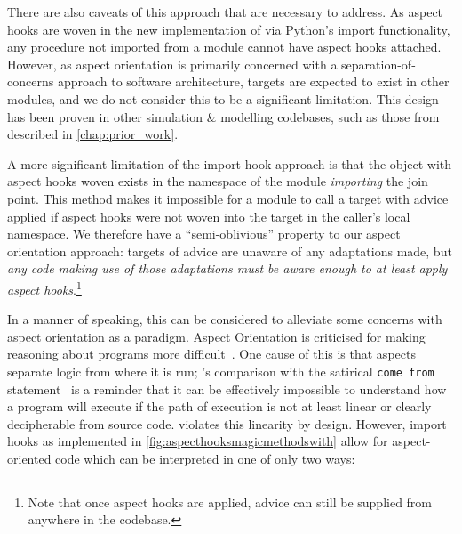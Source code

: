 There are also caveats of this approach that are necessary to address. As aspect
hooks are woven in the new implementation of \pdsf{} via Python's import
functionality, any procedure not imported from a module cannot have aspect hooks
attached.  However, as aspect
orientation is primarily concerned with a separation-of-concerns approach to
software architecture, targets are expected to exist in other modules, and we do
not consider this to be a significant limitation. This design has been proven in
other \aspectoriented{} simulation \& modelling codebases, such as those from
\citet{wallis2018caise} described in \cref{chap:prior_work}.

A more significant limitation of the import hook approach is that the object
with aspect hooks woven exists in the namespace of the module \emph{importing}
the join point. This method makes it impossible for a module to call a target
with advice applied if aspect hooks were not woven into the target in the
caller's local namespace.
We therefore have a ``semi-oblivious'' property to our aspect orientation approach:
targets of advice are unaware of any adaptations made, but \emph{any code making
use of those adaptations must be aware enough to at least apply aspect
hooks}.\footnote{Note that once aspect hooks are applied, advice can still be
supplied from anywhere in the codebase.} 

In a manner of speaking, this can be considered to alleviate some concerns with
aspect orientation as a paradigm. Aspect Orientation is criticised for making
reasoning about programs more
difficult~\cite{przybylek2010wrong,Constantinides04aopconsidered,steimann06paradoxical}.
One cause of this is that aspects separate logic from where it is run;
\citet{Constantinides04aopconsidered}'s comparison with the satirical
\lstinline{come from}
statement~\cite{clark73comefrom,Constantinides04aopconsidered} is a reminder
that it can be effectively impossible to understand how a program will execute
if the path of execution is not at least linear or clearly decipherable from
source code. \Aop{} violates this linearity by design.
However, import hooks as implemented in \cref{fig:aspecthooksmagicmethodswith}
allow for aspect-oriented code which can be interpreted in one of only two ways:

